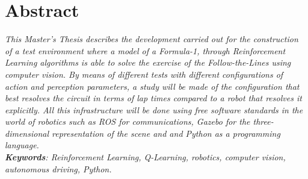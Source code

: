 \thispagestyle{plain}			%
\section*{Abstract}
\textit{This Master's Thesis describes the development carried out for the construction of a test environment where a model of a Formula-1, through Reinforcement Learning algorithms is able to solve the exercise of the Follow-the-Lines using computer vision. By means of different tests with different configurations of action and perception parameters, a study will be made of the configuration that best resolves the circuit in terms of lap times compared to a robot that resolves it explicitly. All this infrastructure will be done using free software standards in the world of robotics such as ROS for communications, Gazebo for the three-dimensional representation of the scene and and Python as a programming language.}\\

\textit{\textbf{Keywords}: Reinforcement Learning, Q-Learning, robotics, computer vision, autonomous driving, Python.}
\newpage				%
\thispagestyle{empty}
\mbox{}
